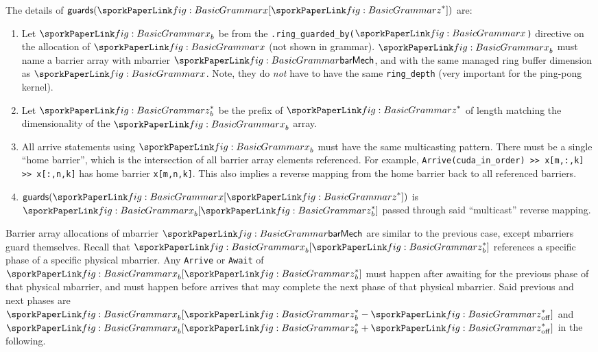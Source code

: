 The details of $\mathsf{guards}(\sporkx[\sporkz^*])$ are:
\begin{enumerate}
  \item Let $\sporkx_b$ be from the
    \texttt{.ring\_guarded\_by($\sporkx$)} directive
    on the allocation of $\sporkx$ (not shown in grammar).
    $\sporkx_b$ must name a barrier array with mbarrier $\sporkbarMech$,
    and with the same managed ring buffer dimension as $\sporkx$.
    Note, they do \emph{not} have to have the same \texttt{ring\_depth}
    (very important for the ping-pong kernel).
  \item Let $\sporkz_b^*$ be the prefix of $\sporkz^*$
    of length matching the dimensionality of the $\sporkx_b$ array.
  \item All arrive statements using $\sporkx_b$ must have the same multicasting pattern.
    There must be a single ``home barrier'', which is the intersection of all barrier array elements referenced.
    For example, \texttt{Arrive(cuda\_in\_order) >> x[m,:,k] >> x[:,n,k]}
    has home barrier \texttt{x[m,n,k]}.
    This also implies a reverse mapping from the home barrier back to all referenced barriers.
  \item $\mathsf{guards}(\sporkx[\sporkz^*])$ is $\sporkx_b[\sporkz_b^*]$
    passed through said ``multicast'' reverse mapping.
\end{enumerate}

Barrier array allocations of mbarrier $\sporkbarMech$ are similar to the previous case,
except mbarriers guard themselves.
Recall that $\sporkx_b[\sporkz_b^*]$ references a specific phase of a specific physical mbarrier.
Any \texttt{Arrive} or \texttt{Await} of $\sporkx_b[\sporkz_b^*]$
must happen after awaiting for the previous phase of that physical mbarrier,
and must happen before arrives that may complete the next phase of that physical mbarrier.
Said previous and next phases are $\sporkx_b[\sporkz_b^* - \sporkz_\mathrm{off}^*]$
and $\sporkx_b[\sporkz_b^* + \sporkz_\mathrm{off}^*]$ in the following.


